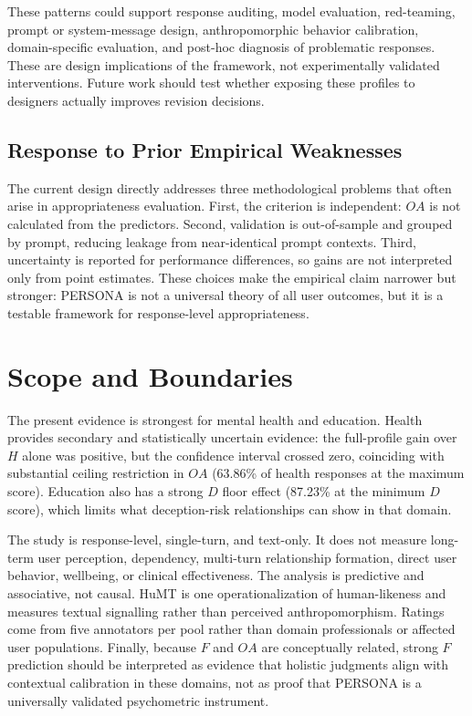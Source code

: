 \documentclass[manuscript,review,anonymous]{acmart}
\begin{document}
These patterns could support response auditing, model evaluation, red-teaming, prompt or system-message design, anthropomorphic behavior calibration, domain-specific evaluation, and post-hoc diagnosis of problematic responses. These are design implications of the framework, not experimentally validated interventions. Future work should test whether exposing these profiles to designers actually improves revision decisions.

\subsection{Response to Prior Empirical Weaknesses}
The current design directly addresses three methodological problems that often arise in appropriateness evaluation. First, the criterion is independent: $OA$ is not calculated from the predictors. Second, validation is out-of-sample and grouped by prompt, reducing leakage from near-identical prompt contexts. Third, uncertainty is reported for performance differences, so gains are not interpreted only from point estimates. These choices make the empirical claim narrower but stronger: PERSONA is not a universal theory of all user outcomes, but it is a testable framework for response-level appropriateness.

\section{Scope and Boundaries}
The present evidence is strongest for mental health and education. Health provides secondary and statistically uncertain evidence: the full-profile gain over $H$ alone was positive, but the confidence interval crossed zero, coinciding with substantial ceiling restriction in $OA$ (63.86\% of health responses at the maximum score). Education also has a strong $D$ floor effect (87.23\% at the minimum $D$ score), which limits what deception-risk relationships can show in that domain.

The study is response-level, single-turn, and text-only. It does not measure long-term user perception, dependency, multi-turn relationship formation, direct user behavior, wellbeing, or clinical effectiveness. The analysis is predictive and associative, not causal. HuMT is one operationalization of human-likeness and measures textual signalling rather than perceived anthropomorphism. Ratings come from five annotators per pool rather than domain professionals or affected user populations. Finally, because $F$ and $OA$ are conceptually related, strong $F$ prediction should be interpreted as evidence that holistic judgments align with contextual calibration in these domains, not as proof that PERSONA is a universally validated psychometric instrument.
\end{document}
